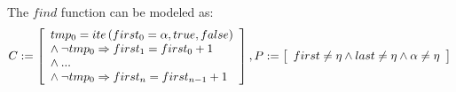 \documentclass[a4paper]{llncs}
\begin{document}

The $find$ function can be modeled as:
%
\begin{equation}
\label{quantifier-free-formulae-find}
C := \left [ \begin{array}{ll}
            tmp_{0} = ite\left(first_{0} = \alpha, true,  false\right) \\
            \wedge \:\neg tmp_{0} \Rightarrow first_{1} = first_{0} + 1 \\
            \wedge \:... \\
            \wedge \:\neg tmp_{0} \Rightarrow first_{n} = first_{n-1} + 1 \\
              \end{array} \right ],  \\
P := \left [ \begin{array}{ll}
            first \neq \eta \wedge last \neq \eta \wedge \alpha \neq \eta \\
              \end{array} \right ]  \\
\end{equation}
%

\end{document}
